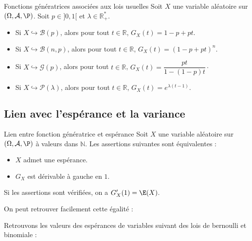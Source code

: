 \documentclass[french,11pt,twoside]{VcCours}
\begin{document}
\begin{Proposition}{Fonctions génératrices associées aux lois usuelles}
Soit $X$ une variable aléatoire sur $(\Omega, \mathcal{A}, \P)$. Soit $p \in ]0,1[$ et $\lambda \in \mathbb{R}_+^{*}$.

\begin{itemize}
\item Si $X \hookrightarrow \mathcal{B}(p)$, alors pour tout $t \in \mathbb{R}$, $G_X(t)=1-p+pt$.
\item Si $X \hookrightarrow \mathcal{B}(n,p)$,  alors pour tout $t \in \mathbb{R}$, $G_X(t)=(1-p+pt)^n$.
\item Si $X \hookrightarrow \mathcal{G}(p)$,  alors pour tout $t \in \mathbb{R}$, $G_X(t)=\dfrac{pt}{1-(1-p)t}\cdot$
\item Si $X \hookrightarrow \mathcal{P}(\lambda)$,  alors pour tout $t \in \mathbb{R}$, $G_X(t)=e^{\lambda(t-1)}$.
\end{itemize}
\end{Proposition}

\begin{Demonstration}{}

\vspace{10cm}
\end{Demonstration}

\subsection{Lien avec l'espérance et la variance}

\begin{Proposition}{Lien entre fonction génératrice et espérance} Soit $X$ une variable aléatoire sur $(\Omega, \mathcal{A}, \P)$ à valeurs dans $\mathbb{N}$. Les assertions suivantes sont équivalentes :

\begin{itemize}
\item $X$ admet une espérance.
\item $G_X$ est dérivable à gauche en $1$.
\end{itemize}
Si les assertions sont vérifiées, on a $G_X'(1)=\E(X)$.
\end{Proposition}

\begin{Remarque}{} On peut retrouver facilement cette égalité :

\vspace{3cm}
\end{Remarque}

\begin{Exemple}{} Retrouvons les valeurs des espérances de variables suivant des lois de bernoulli et binomiale :

\vspace{5cm}
\end{Exemple}
\end{document}
